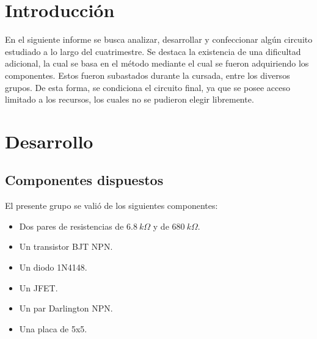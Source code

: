 







\tableofcontents
\newpage

\section{Introducción}
En el siguiente informe se busca analizar, desarrollar y confeccionar algún circuito estudiado a lo largo del cuatrimestre. Se destaca la existencia de una dificultad adicional, la cual se basa en el método mediante el cual se fueron adquiriendo los componentes. Estos fueron subastados durante la cursada, entre los diversos grupos. De esta forma, se condiciona el circuito final, ya que se posee acceso limitado a los recursos, los cuales no se pudieron elegir libremente.

\section{Desarrollo}

\subsection{Componentes dispuestos}
El presente grupo se valió de los siguientes componentes:
\begin{itemize}
	\item Dos pares de resistencias de $6.8 \ k\Omega$ y de $680 \ k\Omega$.
	\item Un transistor BJT NPN. 
	\item Un diodo 1N4148.
	\item Un JFET.
	\item Un par Darlington NPN.
	\item Una placa de 5x5.
\end{itemize}

